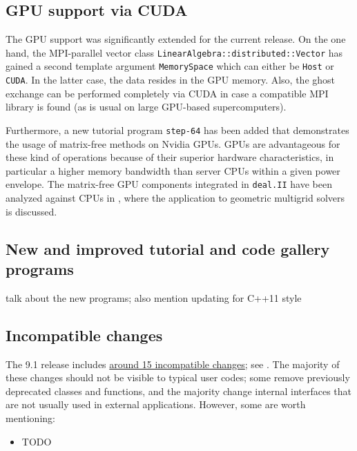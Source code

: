 \documentclass{ansarticle-preprint}
\newcommand{\specialword}[1]{\texttt{#1}}
\newcommand{\dealii}{{\specialword{deal.II}}\xspace}
\begin{document}
\subsection{GPU support via CUDA}

The GPU support was significantly extended for the current release. On the one hand, the MPI-parallel vector class
\texttt{LinearAlgebra::distributed::Vector} has gained a second template
argument \texttt{MemorySpace} which can either be \texttt{Host} or
\texttt{CUDA}. In the latter case, the data resides in the GPU memory. Also,
the ghost exchange can be performed completely via CUDA in case a compatible
MPI library is found (as is usual on large GPU-based supercomputers).

Furthermore, a new tutorial program \texttt{step-64} has been added that demonstrates the usage of matrix-free methods on Nvidia GPUs. GPUs are advantageous for these kind of operations because of their superior hardware characteristics, in particular a higher memory bandwidth than server CPUs within a given power envelope. The matrix-free GPU components integrated in \dealii have been analyzed against CPUs in \cite{KronbichlerLjungkvist2019}, where the application to geometric multigrid solvers is discussed.

\subsection{New and improved tutorial and code gallery programs}

talk about the new programs; also mention updating for C++11 style


\subsection{Incompatible changes}

The 9.1 release includes
\href{https://dealii.org/developer/doxygen/deal.II/changes_between_9_0_0_and_9_1_0.html}
     {around 15 incompatible changes}; see \cite{changes91}. The majority of these changes
should not be visible to typical user codes; some remove previously
deprecated classes and functions, and the majority change internal
interfaces that are not usually used in external
applications. However, some are worth mentioning:
\begin{itemize}
\item TODO
\end{itemize}
\end{document}
